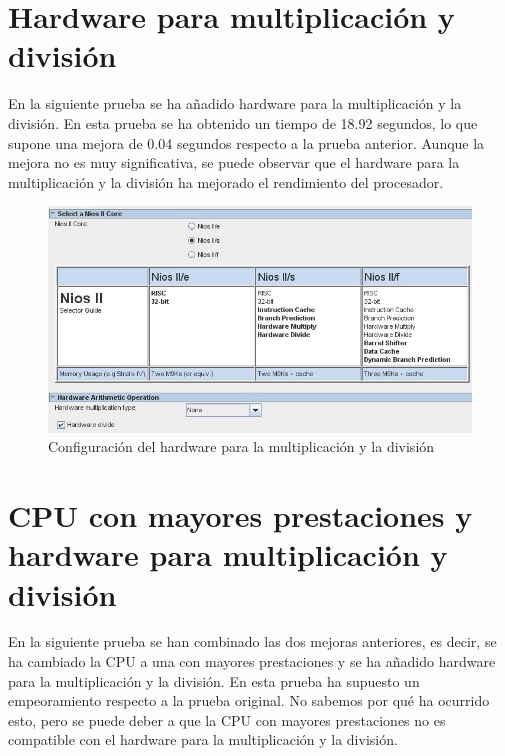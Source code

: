 \documentclass[11pt]{report}
\begin{document}
\newpage

\section{Hardware para multiplicación y división}
En la siguiente prueba se ha añadido hardware para la multiplicación y la división. En esta prueba se ha obtenido un tiempo de 18.92 segundos,
lo que supone una mejora de 0.04 segundos respecto a la prueba anterior. Aunque la mejora no es muy significativa, se puede observar que el
hardware para la multiplicación y la división ha mejorado el rendimiento del procesador.

\begin{figure}[H]
  \centering
  \includegraphics[scale=0.8]{img/activo_hardware_divide.jpeg}
  \caption{Configuración del hardware para la multiplicación y la división}
\end{figure}

\newpage

\section{CPU con mayores prestaciones y hardware para multiplicación y división}
En la siguiente prueba se han combinado las dos mejoras anteriores, es decir, se ha cambiado la CPU a una con mayores prestaciones y se ha añadido
hardware para la multiplicación y la división. En esta prueba ha supuesto un empeoramiento respecto a la prueba original. No sabemos por qué
ha ocurrido esto, pero se puede deber a que la CPU con mayores prestaciones no es compatible con el hardware para la multiplicación y la división.
\end{document}
